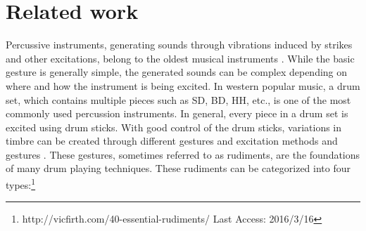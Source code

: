 \documentclass{article}
\begin{document}
\section{Related work}\label{sec:related_work}
{\color{red}{Terminology: is gestures the right word, later you seem to use gestures as a synonym to playing technique as well? Is piece the right word for an instrument in a drum set?}}
Percussive instruments, generating sounds through vibrations induced by strikes and other excitations, belong to the oldest musical instruments \cite{Rossing2001}. While the basic gesture is generally simple, the generated sounds can be complex depending on where and how the instrument is being excited. In western popular music, a drum set, which contains multiple pieces such as SD, BD, HH, etc., is one of the most commonly used percussion instruments. In general, every piece in a drum set is excited using drum sticks. With good control of the drum sticks, variations in timbre can be created through different gestures and excitation methods and gestures \cite{Stone2009}. These gestures, sometimes referred to as rudiments, are the foundations of many drum playing techniques. These rudiments can be categorized into four types:\footnote{http://vicfirth.com/40-essential-rudiments/ Last Access: 2016/3/16}
\end{document}
